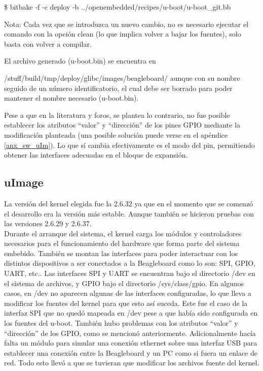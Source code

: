 \centerline{\$ bitbake -f -c deploy -b ../openembedded/recipes/u-boot/u-boot\_git.bb}

\bigskip
Nota: Cada vez que se introduzca un nuevo cambio, no es necesario ejecutar el comando con la opción clean (lo que implica volver a bajar los fuentes), solo basta con volver a compilar.

\bigskip
El archivo generado (u-boot.bin) se encuentra en 

/stuff/build/tmp/deploy/glibc/images/beagleboard/ aunque con su nombre seguido de un número identificatorio, el cual debe ser borrado para poder mantener el nombre necesario (u-boot.bin).

\bigskip
Pese a que en la literatura y foros, se plantea lo contrario, no fue posible establecer los atributos “valor” y “dirección” de los pines GPIO mediante la modificación planteada (una posible solución puede verse en el apéndice \ref{anx_sw_uIm}). Lo que sí cambia efectivamente es el modo del pin, permitiendo obtener las interfaces adecuadas en el bloque de expansión.

\subsection{uImage}
La versión del kernel elegida fue la 2.6.32 ya que en el momento que se comenzó el desarrollo era la versión más estable. Aunque también se hicieron pruebas con las versiones 2.6.29 y 2.6.37.\\
Durante el arranque del sistema, el kernel carga los módulos y controladores necesarios para el funcionamiento del 
hardware que forma parte del sistema embebido. También se montan las interfaces para poder interactuar con los distintos dispositivos a ser conectados a la Beagleboard como lo son: SPI, GPIO, UART, etc.. Las interfaces SPI y UART se encuentran bajo el directorio /dev en el sistema de archivos, y GPIO bajo el directorio /sys/class/gpio. En algunos casos, en /dev no aparecen algunas de las interfaces configuradas, lo que lleva a modificar los fuentes del kernel para que esto así suceda. Este fue el caso de la interfaz SPI que no quedó mapeada en /dev pese a que había sido configurada en los fuentes del u-boot. También hubo problemas con los atributos “valor” y “dirección” de los GPIO, como se mencionó anteriormente. Adicionalmente hacía falta un módulo para simular una conexión ethernet sobre una interfaz USB para establecer una conexión entre la Beagleboard y un PC como si fuera un enlace de red. 
Todo esto llevó a que se tuvieran que modificar los archivos fuente del kernel.


